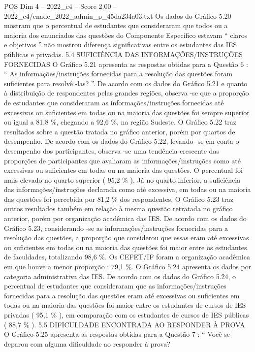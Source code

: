\begin{textsample}{POS Dim 4 – 2022\_c4 – Score 2.00 – 2022\_c4/enade\_2022\_admin\_p\_45da234a03.txt}
Os dados do Gráfico 5.20 mostram que o percentual de estudantes que consideraram que todos ou a maioria dos enunciados das questões do Componente Específico estavam “ claros e objetivos ” não mostrou diferença significativas entre os estudantes das IES públicas e privadas. 5.4 SUFICIÊNCIA DAS INFORMAÇÕES/INSTRUÇÕES FORNECIDAS O Gráfico 5.21 apresenta as respostas obtidas para a Questão 6 : “ As informações/instruções fornecidas para a resolução das questões foram suficientes para resolvê -las? ”.
De acordo com os dados do Gráfico 5.21 e quanto à distribuição de respondentes pelas grandes regiões, observa -se que a proporção de estudantes que consideraram as informações/instruções fornecidas até excessivas ou suficientes em todas ou na maioria das questões foi sempre superior ou igual a 81,8 \%, chegando a 92,6 \%, na região Sudeste.
O Gráfico 5.22 traz resultados sobre a questão tratada no gráfico anterior, porém por quartos de desempenho.
De acordo com os dados do Gráfico 5.22, levando -se em conta o desempenho dos participantes, observa -se uma tendência crescente das proporções de participantes que avaliaram as informações/instruções como até excessivas ou suficientes em todas ou na maioria das questões.
O percentual foi mais elevado no quarto superior ( 95,2 \% ).
Já no quarto inferior, a suficiência das informações/instruções declarada como até excessiva, em todas ou na maioria das questões foi percebida por 81,2 \% dos respondentes.
O Gráfico 5.23 traz outros resultados também em relação à mesma questão retratada no gráfico anterior, porém por organização acadêmica das IES.
De acordo com os dados do Gráfico 5.23, considerando -se as informações/instruções fornecidas para a resolução das questões, a proporção que considerou que essas eram até excessivas ou suficientes em todas ou na maioria das questões foi maior entre os estudantes de faculdades, totalizando 98,6 \%.
Os CEFET/IF foram a organização acadêmica em que houve a menor proporção : 79,1 \%.
O Gráfico 5.24 apresenta os dados por categoria administrativa das IES.
De acordo com os dados do Gráfico 5.24, o percentual de estudantes que consideraram que as informações/instruções fornecidas para a resolução das questões eram até excessivas ou suficientes em todas ou na maioria das questões foi maior entre os estudantes de cursos de IES privadas ( 95,1 \% ), em comparação com os estudantes de cursos de IES públicas ( 88,7 \% ). 5.5 DIFICULDADE ENCONTRADA AO RESPONDER À PROVA O Gráfico 5.25 apresenta as respostas obtidas para a Questão 7 : “ Você se deparou com alguma dificuldade ao responder à prova?

\end{textsample}
